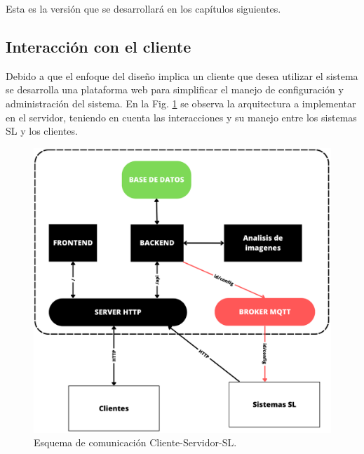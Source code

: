 Esta es la versión que se desarrollará en los capítulos siguientes.

\subsection{Interacción con el cliente}

Debido a que el enfoque del diseño implica un cliente que desea utilizar el sistema se desarrolla una plataforma web para simplificar el manejo de configuración y administración del sistema. En la Fig. \ref{fig:esquema-cliente-servidor-sl} se observa la arquitectura a implementar en el servidor, teniendo en cuenta las interacciones y su manejo entre los sistemas SL y los clientes.
\begin{figure}[bth]
    \centering
    \includegraphics[width=.4\textwidth]{imgs/server-clientes-barreras.png}
    \caption{Esquema de comunicación Cliente-Servidor-SL.}
    \label{fig:esquema-cliente-servidor-sl}
\end{figure}

